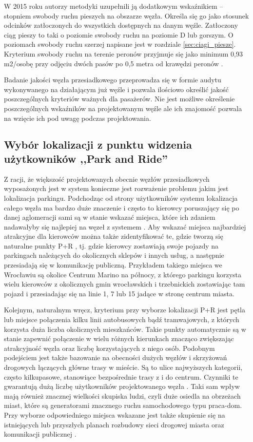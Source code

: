 \documentclass[twoside,12pt]{article}
\begin{document}
W 2015 roku autorzy metodyki uzupełnili ją dodatkowym wskaźnikiem -- stopniem swobody ruchu pieszych na obszarze węzła. Określa się go jako stosunek odcinków zatłoczonych do wszystkich dostępnych na danym węźle. Zatłoczony ciąg pieszy to taki o poziomie swobody ruchu na poziomie D lub gorszym. O poziomach swobody ruchu szerzej napisane jest w rozdziale \ref{sec:ciagi_piesze}. Kryterium swobody ruchu na terenie peronów przyjmuje się jako minimum 0,93 m2/osobę przy odjęciu dwóch pasów po 0,5 metra od krawędzi peronów \cite{metodyka2}.  

Badanie jakości węzła przesiadkowego przeprowadza się w formie audytu wykonywanego na działającym już węźle i pozwala ilościowo określić jakość poszczególnych kryteriów ważnych dla pasażerów. Nie jest możliwe określenie poszczególnych wskaźników na projektowanym węźle ale ich znajomość pozwala na wzięcie ich pod uwagę podczas projektowania.

	\clearpage
	\subsection{Wybór lokalizacji z punktu widzenia użytkowników ,,Park and Ride''}
	
	Z racji, że większość projektowanych obecnie węzłów przesiadkowych wyposażonych jest w system \pnr{} konieczne jest rozważenie problemu jakim jest lokalizacja parkingu. Podchodząc od strony użytkowników systemu \pnr{} lokalizacja całego węzła ma bardzo duże znaczenie i często to kierowcy poruszający się po danej aglomeracji sami są w stanie wskazać miejsca, które ich zdaniem nadawałyby się najlepiej na węzeł z systemem \pnr{}. Aby wskazać miejsca najbardziej atrakcyjne dla kierowców można także zidentyfikować te, gdzie tworzą się naturalne punkty P+R \cite{guide}, tj. gdzie kierowcy zostawiają swoje pojazdy na parkingach należących do okolicznych sklepów i innych usług, a następnie przesiadają się w komunikację publiczną. Przykładem takiego miejsca we Wrocławiu są okolice Centrum Marino na północy, z którego parkingu korzysta wielu kierowców z okolicznych gmin wrocławskich i trzebnickich zostawiając tam pojazd i przesiadając się na linie 1, 7 lub 15 jadące w stronę centrum miasta. 
	
	Kolejnym, naturalnym wręcz, kryterium przy wyborze lokalizacji P+R jest pętla lub miejsce połączenia kilku linii autobusowych bądź tramwajowych, z których korzysta duża liczba okolicznych mieszkańców. Takie punkty automatycznie są w stanie zapewnić połączenie w wielu różnych kierunkach znacząco zwiększając atrakcyjność węzła oraz liczbę korzystających z niego osób. Podobnym podejściem jest także bazowanie na obecności dużych węzłów i skrzyżowań drogowych łączących główne trasy w mieście. Są to ulice najwyższych kategorii, często kilkupasowe, stanowiące bezpośrednie trasy z i do centrum. Czynniki te gwarantują dużą liczbę użytkowników projektowanego węzła \pnr{}. Taki sam wpływ mają również znacznej wielkości skupiska ludzi, czyli duże osiedla na obrzeżach miast, które są generatorami znacznego ruchu samochodowego typu praca-dom. Przy wyborze odpowiedniego miejsca wskazane jest także skupienie się na istniejących lub przyszłych planach rozbudowy sieci drogowej miasta oraz komunikacji publicznej \cite{guide}. 
	
\end{document}
